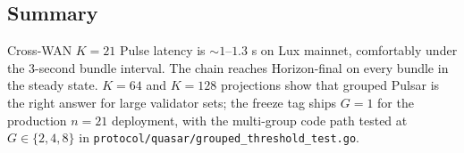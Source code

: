 \subsection{Summary}

Cross-WAN $K = 21$ Pulse latency is $\sim 1$--$1.3$ s on Lux mainnet, comfortably under the 3-second bundle interval. The chain reaches Horizon-final on every bundle in the steady state. $K = 64$ and $K = 128$ projections show that grouped Pulsar is the right answer for large validator sets; the freeze tag ships $G = 1$ for the production $n = 21$ deployment, with the multi-group code path tested at $G \in \{2, 4, 8\}$ in \texttt{protocol/quasar/grouped\_threshold\_test.go}.
